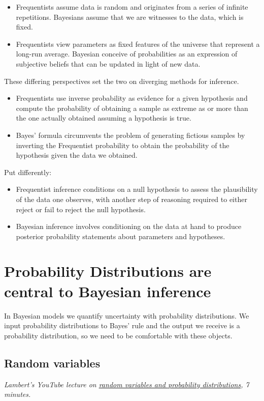 \documentclass[]{article}
\begin{document}
\begin{itemize}
\item
  Frequentists assume data is random and originates from a series of
  infinite repetitions. Bayesians assume that we are witnesses to the
  data, which is fixed.
\item
  Frequentists view parameters as fixed features of the universe that
  represent a long-run average. Bayesian conceive of probabilities as an
  expression of subjective beliefs that can be updated in light of new
  data.
\end{itemize}

These differing perspectives set the two on diverging methods for inference. 
\begin{itemize}
\item
Frequentists use inverse probability as evidence for a
given hypothesis and compute the probability of obtaining a sample as
extreme as or more than the one actually obtained assuming a hypothesis
is true.
\item
Bayes' formula circumvents the problem of generating fictious
samples by inverting the Frequentist probability to obtain the
probability of the hypothesis given the data we obtained.
\end{itemize}

Put differently: 
\begin{itemize}
\item
Frequentist inference conditions on a null hypothesis
to assess the plausibility of the data one observes, with another step
of reasoning required to either reject or fail to reject the null hypothesis.
\item 
Bayesian inference involves conditioning on the data at
hand to produce posterior probability statements about parameters and
hypotheses.
\end{itemize}

\section{Probability Distributions are central to Bayesian inference}

In Bayesian models we quantify uncertainty with probability
distributions. We input probability distributions to Bayes' rule and the
output we receive is a probability distribution, so we need to be
comfortable with these objects.

\subsection{Random variables}
\emph{Lambert's YouTube lecture on \href{https://youtu.be/pvkhK03aFDM}{random variables and probability distributions}, 7 minutes.}
\end{document}
